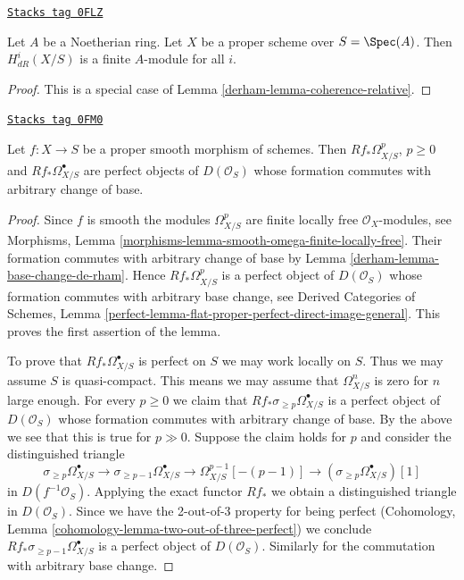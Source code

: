 \begin{lemma}
\label{derham-lemma-finite-de-Rham}
\href{https://stacks.math.columbia.edu/tag/0FLZ}{\texttt{Stacks tag 0FLZ}}

Let $A$ be a Noetherian ring. Let $X$ be a proper scheme over $S = \Spec(A)$.
Then $H^i_{dR}(X/S)$ is a finite $A$-module for all $i$.
\end{lemma}

\begin{proof}

This is a special case of Lemma \ref{derham-lemma-coherence-relative}.
\end{proof}

\begin{lemma}
\label{derham-lemma-proper-smooth-de-Rham}
\href{https://stacks.math.columbia.edu/tag/0FM0}{\texttt{Stacks tag 0FM0}}

Let $f : X \to S$ be a proper smooth morphism of schemes. Then
$Rf_*\Omega^p_{X/S}$, $p \geq 0$ and $Rf_*\Omega^\bullet_{X/S}$ are
perfect objects of $D(\mathcal{O}_S)$ whose formation commutes
with arbitrary change of base.
\end{lemma}

\begin{proof}

Since $f$ is smooth the modules $\Omega^p_{X/S}$ are finite locally
free $\mathcal{O}_X$-modules, see Morphisms, Lemma
\ref{morphisms-lemma-smooth-omega-finite-locally-free}. Their
formation commutes with arbitrary change of base by
Lemma \ref{derham-lemma-base-change-de-rham}. Hence
$Rf_*\Omega^p_{X/S}$ is a perfect object of $D(\mathcal{O}_S)$
whose formation commutes with arbitrary base change, see
Derived Categories of Schemes, Lemma
\ref{perfect-lemma-flat-proper-perfect-direct-image-general}.
This proves the first assertion of the lemma.

\medskip\noindent
To prove that $Rf_*\Omega^\bullet_{X/S}$ is perfect on $S$ we may work
locally on $S$. Thus we may assume $S$ is quasi-compact. This means
we may assume that $\Omega^n_{X/S}$ is zero for $n$ large enough.
For every $p \geq 0$ we claim that
$Rf_*\sigma_{\geq p}\Omega^\bullet_{X/S}$ is a
perfect object of $D(\mathcal{O}_S)$ whose formation commutes
with arbitrary change of base. By the above we see that
this is true for $p \gg 0$. Suppose the claim holds for $p$
and consider the distinguished triangle
$$
\sigma_{\geq p}\Omega^\bullet_{X/S} \to
\sigma_{\geq p - 1}\Omega^\bullet_{X/S} \to
\Omega^{p - 1}_{X/S}[-(p - 1)] \to
(\sigma_{\geq p}\Omega^\bullet_{X/S})[1]
$$
in $D(f^{-1}\mathcal{O}_S)$.
Applying the exact functor $Rf_*$ we obtain a distinguished triangle
in $D(\mathcal{O}_S)$.
Since we have the 2-out-of-3 property for being perfect
(Cohomology, Lemma \ref{cohomology-lemma-two-out-of-three-perfect})
we conclude $Rf_*\sigma_{\geq p - 1}\Omega^\bullet_{X/S}$ is a
perfect object of $D(\mathcal{O}_S)$. Similarly for the
commutation with arbitrary base change.
\end{proof}

